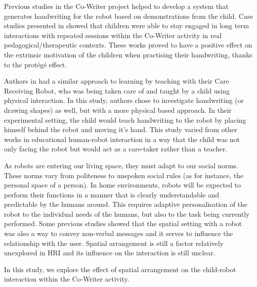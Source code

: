 \documentclass[letterpaper, 10 pt, conference]{ieeeconf}  %
\begin{document}
Previous studies in the Co-Writer project helped to develop a system that generates handwriting for the robot based on demonstrations from the child\cite{hood2015when}.
Case studies presented in \cite{jacq2016building} showed that children were able to stay engaged in long term interactions with repeated sessions within the Co-Writer activity in real pedagogical/therapeutic contexts.
These works proved to have a positive effect on the extrinsic motivation of the children when practising their handwriting, thanks to the protégé effect.

Authors in \cite{Matsuzoe2012} had a similar approach to learning by teaching with their Care Receiving Robot, who was being taken care of and taught by a child using physical interaction. 
In this study, authors chose to investigate handwriting (or drawing shapes) as well, but with a more physical based approach.
In their experimental setting, the child would teach handwriting to the robot by placing himself behind the robot and moving it's hand.
This study varied from other works in educational human-robot interaction in a way that the child was not only facing the robot but would act as a care-taker rather than a teacher.

As robots are entering our living space, they must adapt to our social norms.
These norms vary from politeness to unspoken social rules (as for instance, the personal space of a person).
In home environments, robots will be expected to perform their functions in a manner that is clearly understandable and predictable by the humans around.
This requires adaptive personalisation of the robot to the individual needs of the humans, but also to the task being currently performed.
Some previous studies showed that the spatial setting with a robot was also a way to convey non-verbal messages and it serves to influence the relationship with the user\cite{Takayama2009,kristoffersson2013measuring}. 
Spatial arrangement is still a factor relatively unexplored in HRI and its influence on the interaction is still unclear. 

In this study, we explore the effect of spatial arrangement on the child-robot interaction within the Co-Writer activity.
\end{document}
